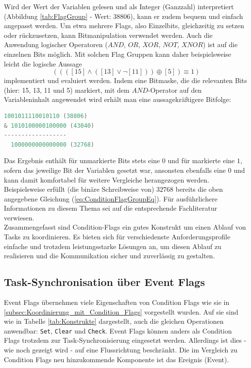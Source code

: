 \documentclass{llncs}
\begin{document}
Wird der Wert der Variablen gelesen und als Integer (Ganzzahl) interpretiert (Abbildung \ref{tab:FlagGroup} - Wert: $38806$), kann er zudem bequem und einfach angepasst werden. Um etwa mehrere Flags, also Einzelbits, gleichzeitig zu setzen oder rückzusetzen, kann Bitmanipulation verwendet werden. Auch die Anwendung logischer Operatoren ($AND$, $OR$, $XOR$, $NOT$, $XNOR$) ist auf die einzelnen Bits möglich. Mit solchen Flag Gruppen kann daher beispielsweise leicht die logische Aussage %
\begin{equation}
((([15] \wedge ([13] \vee \neg[11]))\oplus [5])\equiv 1)
\label{eq:ConditionFlagGroupEq}
\end{equation}
implementiert und evaluiert werden. Indem eine Bitmaske, die die relevanten Bits (hier: 15, 13, 11 und 5) markiert, mit dem $AND$-Operator auf den Variableninhalt angewendet wird erhält man eine aussagekräftigere Bitfolge:
{
\lstset{basicstyle=\footnotesize, frame=tb, xleftmargin=.3\textwidth, xrightmargin=.3\textwidth}
\begin{lstlisting}[language=C]
  1001011110010110 (38806)
& 1010100000100000 (43040)
------------------
  1000000000000000 (32768)
\end{lstlisting}
}
Das Ergebnis enthält für unmarkierte Bits stets eine $0$ und für markierte eine $1$, sofern das jeweilige Bit der Variablen gesetzt war, ansonsten ebenfalls eine $0$ und kann damit komfortabel für weitere Vergleiche herangezogen werden. Beispielsweise erfüllt (die binäre Schreibweise von) $32768$ bereits die oben angegebene Gleichung (\ref{eq:ConditionFlagGroupEq}).  Für ausführlichere Informationen zu diesem Thema sei auf die entsprechende Fachliteratur verwiesen.\\

Zusammengefasst sind Condition-Flags ein gutes Konstrukt um einen Ablauf von Tasks zu koordinieren. Es bieten sich für verschiedenste Anforderungsprofile einfache und trotzdem leistungsstarke Lösungen an, um diesen Ablauf zu realisieren und die Kommunikation sicher und zuverlässig zu gestalten.

\subsection{Task-Synchronisation über Event Flags}
\label{subsec:Task-Synchronisation_Event_Flags}
Event Flags übernehmen viele Eigenschaften von Condition Flags wie sie in \ref{subsec:Koordinierung_mit_Condition_Flags} vorgestellt wurden. Auf sie sind wie in Tabelle \ref{tab:Konstrukte} dargestellt, auch die gleichen Operationen anwendbar: \texttt{Set}, \texttt{Clear} und \texttt{Check}. Event Flags können anders als Condition Flags trotzdem zur Task-Synchronisierung eingesetzt werden. Allerdings ist dies - wie noch gezeigt wird - auf eine Flussrichtung beschränkt. Die im Vergleich zu Condition Flags neu hinzukommende Komponente ist das Ereignis (Event).\\
\end{document}
